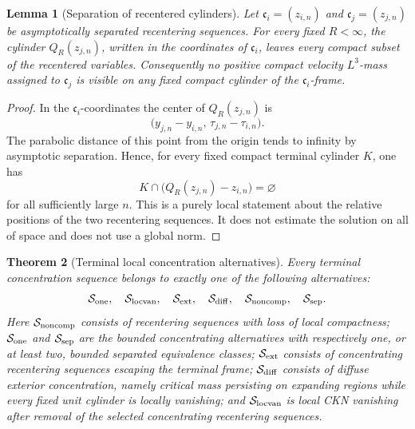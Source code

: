 \documentclass[11pt]{amsart}
\numberwithin{equation}{section}
\theoremstyle{plain}
\newtheorem{theorem}{Theorem}[section]
\newtheorem{lemma}[theorem]{Lemma}
\theoremstyle{definition}
\theoremstyle{remark}
\begin{document}
\begin{lemma}[Separation of recentered cylinders]
\label{lem:separated-recentered-cylinders}
Let \(\mathfrak c_i=(z_{i,n})\) and \(\mathfrak c_j=(z_{j,n})\) be
asymptotically separated recentering sequences.  For every fixed \(R<\infty\), the
cylinder \(Q_R(z_{j,n})\), written in the coordinates of \(\mathfrak c_i\),
leaves every compact subset of the recentered variables.  Consequently
no positive compact velocity \(L^3\)-mass assigned to \(\mathfrak c_j\) is visible on any
fixed compact cylinder of the \(\mathfrak c_i\)-frame.
\end{lemma}

\begin{proof}
In the \(\mathfrak c_i\)-coordinates the center of \(Q_R(z_{j,n})\) is
\[
   \bigl(y_{j,n}-y_{i,n},\,\tau_{j,n}-\tau_{i,n}\bigr).
\]
The parabolic distance of this point from the origin tends to infinity by
asymptotic separation.  Hence, for every fixed compact terminal cylinder
\(K\), one has
\[
   K\cap\bigl(Q_R(z_{j,n})-z_{i,n}\bigr)=\varnothing
\]
for all sufficiently large \(n\).  This is a purely local statement about the
relative positions of the two recentering sequences.  It does not estimate the solution on
all of space and does not use a global norm.
\end{proof}

\begin{theorem}[Terminal local concentration alternatives]
\label{thm:terminal-exhaustion-main}
Every terminal concentration sequence belongs to exactly one of the following
alternatives:
\[
   \mathcal S_{\rm one},\quad
   \mathcal S_{\rm locvan},\quad
   \mathcal S_{\rm ext},\quad
   \mathcal S_{\rm diff},\quad
   \mathcal S_{\rm noncomp},\quad
   \mathcal S_{\rm sep}.
\]
Here \(\mathcal S_{\rm noncomp}\) consists of recentering sequences with loss of
local compactness; \(\mathcal S_{\rm one}\) and \(\mathcal S_{\rm sep}\) are
the bounded concentrating alternatives with respectively one, or at least two,
bounded separated equivalence classes; \(\mathcal S_{\rm ext}\) consists of
concentrating recentering sequences escaping the terminal frame; \(\mathcal
S_{\rm diff}\) consists of diffuse exterior concentration, namely critical mass
persisting on expanding regions while every fixed unit cylinder is locally
vanishing; and \(\mathcal S_{\rm locvan}\) is local CKN vanishing after removal
of the selected concentrating recentering sequences.
\end{theorem}
\end{document}

